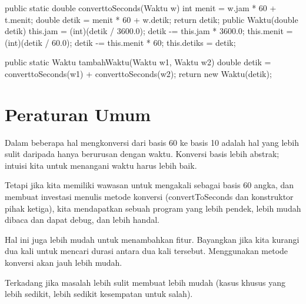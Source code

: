 public static double converttoSeconds(Waktu w)\textbraceleft \newline
	int menit = w.jam * 60 + t.menit; \newline
	double detik = menit * 60 + w.detik; \newline
	return detik; \newline
\textbraceright \newline
\newline
public Waktu(double detik)\textbraceleft \newline
	this.jam = (int)(detik / 3600.0); \newline
	detik -= this.jam * 3600.0; \newline
	this.menit = (int)(detik / 60.0); \newline
	detik -= this.menit * 60; \newline
	this.detiks = detik; \newline
\textbraceright \newline

public static Waktu tambahWaktu(Waktu w1, Waktu w2)\textbraceleft \newline
	double detik = converttoSeconds(w1) + converttoSeconds(w2); \newline
	return new Waktu(detik); \newline
\textbraceright \newline

\section{Peraturan Umum}

Dalam beberapa hal mengkonversi dari basis 60 ke basis 10 adalah hal yang lebih sulit daripada hanya berurusan dengan waktu. Konversi basis lebih abstrak; intuisi kita untuk menangani waktu harus lebih baik.

Tetapi jika kita memiliki wawasan untuk mengakali sebagai basis 60 angka, dan membuat investasi menulis metode konversi (convertToSeconds dan konstruktor pihak ketiga), kita mendapatkan sebuah program yang lebih pendek, lebih mudah dibaca dan dapat debug, dan lebih handal.

Hal ini juga lebih mudah untuk menambahkan fitur. Bayangkan jika kita kurangi dua kali untuk mencari durasi antara dua kali tersebut. Menggunakan metode konversi akan jauh lebih mudah.

Terkadang jika masalah lebih sulit membuat lebih mudah (kasus khusus yang lebih sedikit, lebih sedikit kesempatan untuk salah).

